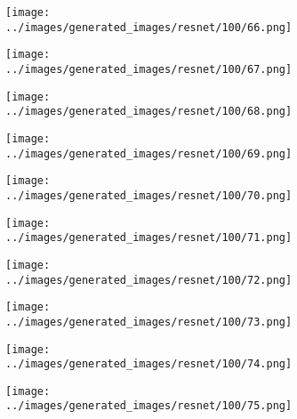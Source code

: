 \begin{figure}[H]
\begin{subfigure}[b]{0.1\textwidth}
\centering
\texttt{[image: ../images/generated\_images/resnet/100/66.png]}
\end{subfigure}
\hspace{1em}%
\begin{subfigure}[b]{0.1\textwidth}
\centering
\texttt{[image: ../images/generated\_images/resnet/100/67.png]}
\end{subfigure}
\hspace{1em}%
\begin{subfigure}[b]{0.1\textwidth}
\centering
\texttt{[image: ../images/generated\_images/resnet/100/68.png]}
\end{subfigure}
\hspace{1em}%
\begin{subfigure}[b]{0.1\textwidth}
\centering
\texttt{[image: ../images/generated\_images/resnet/100/69.png]}
\end{subfigure}
\hspace{1em}%
\begin{subfigure}[b]{0.1\textwidth}
\centering
\texttt{[image: ../images/generated\_images/resnet/100/70.png]}
\end{subfigure}
\hspace{1em}%
\begin{subfigure}[b]{0.1\textwidth}
\centering
\texttt{[image: ../images/generated\_images/resnet/100/71.png]}
\end{subfigure}
\hspace{1em}%
\begin{subfigure}[b]{0.1\textwidth}
\centering
\texttt{[image: ../images/generated\_images/resnet/100/72.png]}
\end{subfigure}
\hspace{1em}%
\begin{subfigure}[b]{0.1\textwidth}
\centering
\texttt{[image: ../images/generated\_images/resnet/100/73.png]}
\end{subfigure}
\hspace{1em}%
\begin{subfigure}[b]{0.1\textwidth}
\centering
\texttt{[image: ../images/generated\_images/resnet/100/74.png]}
\end{subfigure}
\hspace{1em}%
\begin{subfigure}[b]{0.1\textwidth}
\centering
\texttt{[image: ../images/generated\_images/resnet/100/75.png]}

\end{subfigure}
\end{figure}
